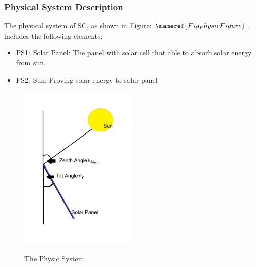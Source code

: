 \documentclass[12pt]{article}
\begin{document}
\subsubsection{Physical System Description} \label{sec_phySystDescrip}

The physical system of SC, as shown in Figure: $\nameref{Fig_PhysicFigure}$,
includes the following elements:

\begin{itemize}

\item[ ] PS1: Solar Panel: The panel with solar cell that able to absorb solar energy from sun.

\item[ ] PS2: Sun: Proving solar energy to solar panel


\end{itemize}
 
 

\begin{figure}[h!]
\begin{center}
{
 \includegraphics[width=0.5\textwidth]{PhysicFigure.pdf}
 }
 \caption{\label{Fig_PhysicFigure} The Physic System}
 \end{center}
\end{figure}
\end{document}
